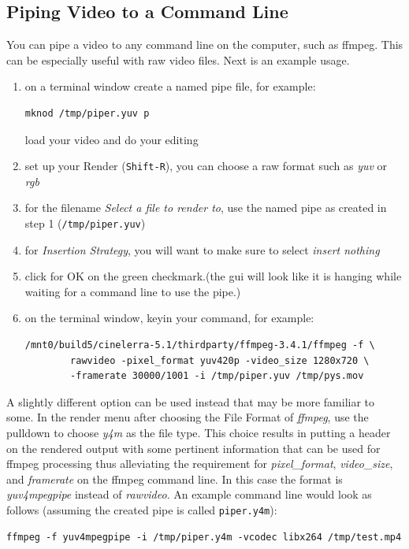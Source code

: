 \subsection{Piping Video to a Command Line}%
\label{sub:piping_video_command_line}

You can pipe a video to any command line on the computer, such as
ffmpeg.  This can be especially useful with raw video files.  Next
is an example usage.

\begin{enumerate}
	\item on a terminal window create a named pipe file, for example:
	\begin{lstlisting}[style=sh]
		mknod /tmp/piper.yuv p
	\end{lstlisting} load your video and do your editing
	\item set up your Render (\texttt{Shift-R}), you can choose a raw
	format such as \textit{yuv} or \textit{rgb}
	\item for the filename \textit{Select a file to render to}, use the
	named pipe as created in step 1 (\texttt{/tmp/piper.yuv})
	\item for \textit{Insertion Strategy}, you will want to make sure to
	select \textit{insert nothing}
	\item click for OK on the green checkmark.(the \CGG{} gui will look
	like it is hanging while waiting for a command line to use the
	pipe.)
	\item on the terminal window, keyin your command, for example:
	\begin{lstlisting}[style=sh]
		/mnt0/build5/cinelerra-5.1/thirdparty/ffmpeg-3.4.1/ffmpeg -f \
		rawvideo -pixel_format yuv420p -video_size 1280x720 \
		-framerate 30000/1001 -i /tmp/piper.yuv /tmp/pys.mov
	\end{lstlisting}
\end{enumerate}

A slightly different option can be used instead that may be more
familiar to some.  In the render menu after choosing the File Format
of \textit{ffmpeg}, use the pulldown to choose \textit{y4m} as the
file type.  This choice results in putting a header on the rendered
output with some pertinent information that can be used for ffmpeg
processing thus alleviating the requirement for
\textit{pixel\_format}, \textit{video\_size}, and \textit{framerate}
on the ffmpeg command line.  In this case the format is
\textit{yuv4mpegpipe} instead of \textit{rawvideo}.  An example
command line would look as follows (assuming the created pipe is
called \texttt{piper.y4m}):
\begin{lstlisting}[style=sh]
	ffmpeg -f yuv4mpegpipe -i /tmp/piper.y4m -vcodec libx264 /tmp/test.mp4
\end{lstlisting}

